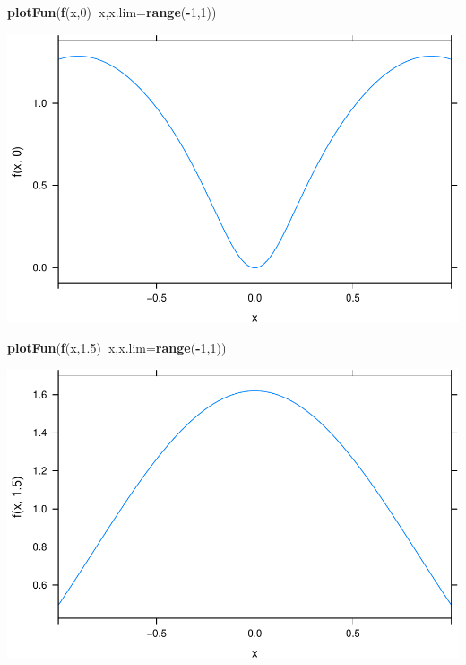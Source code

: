 \documentclass[
]{book}
\newenvironment{Shaded}{\begin{snugshade}}{\end{snugshade}}
\newcommand{\DataTypeTok}[1]{\textcolor[rgb]{0.13,0.29,0.53}{#1}}
\newcommand{\DecValTok}[1]{\textcolor[rgb]{0.00,0.00,0.81}{#1}}
\newcommand{\FloatTok}[1]{\textcolor[rgb]{0.00,0.00,0.81}{#1}}
\newcommand{\KeywordTok}[1]{\textcolor[rgb]{0.13,0.29,0.53}{\textbf{#1}}}
\newcommand{\NormalTok}[1]{#1}
\newcommand{\OperatorTok}[1]{\textcolor[rgb]{0.81,0.36,0.00}{\textbf{#1}}}
\begin{document}
\begin{Shaded}
\begin{Highlighting}[]
\KeywordTok{plotFun}\NormalTok{(}\KeywordTok{f}\NormalTok{(x,}\DecValTok{0}\NormalTok{)}\OperatorTok{~}\NormalTok{x,}\DataTypeTok{x.lim=}\KeywordTok{range}\NormalTok{(}\OperatorTok{-}\DecValTok{1}\NormalTok{,}\DecValTok{1}\NormalTok{))}
\end{Highlighting}
\end{Shaded}

\includegraphics{_bookdown_files/math135_handbook_files/figure-latex/unnamed-chunk-79-2.pdf}

\begin{Shaded}
\begin{Highlighting}[]
\KeywordTok{plotFun}\NormalTok{(}\KeywordTok{f}\NormalTok{(x,}\FloatTok{1.5}\NormalTok{)}\OperatorTok{~}\NormalTok{x,}\DataTypeTok{x.lim=}\KeywordTok{range}\NormalTok{(}\OperatorTok{-}\DecValTok{1}\NormalTok{,}\DecValTok{1}\NormalTok{))}
\end{Highlighting}
\end{Shaded}

\includegraphics{_bookdown_files/math135_handbook_files/figure-latex/unnamed-chunk-79-3.pdf}
\end{document}
